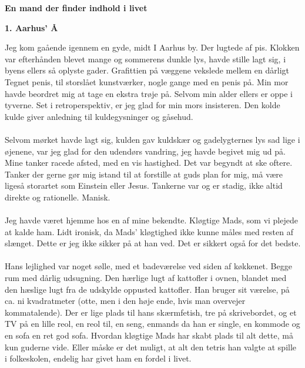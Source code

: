 \documentclass[]{article}
\begin{document}
\newpage

\begin{center}
	\Large\textbf{En mand der finder indhold i livet}
\end{center}

\begin{center}
	\large\textbf{1. Aarhus’ Å}
\end{center}

Jeg kom gaående igennem en gyde, midt I Aarhus by. Der lugtede af pis. Klokken var efterhånden blevet mange og sommerens dunkle lys, havde stille lagt sig, i byens ellers så oplyste gader. Grafittien på væggene vekslede mellem en dårligt Tegnet penis, til storslået kunstværker, nogle gange med en penis på. Min mor havde beordret mig at tage en ekstra trøje på. Selvom min alder ellers er oppe i tyverne. Set i retroperspektiv, er jeg glad for min mors insisteren. Den kolde kulde giver anledning til kuldegysninger og gåsehud.
\\ \\
Selvom mørket havde lagt sig, kulden gav kuldskær og gadelygternes lys sad lige i øjenene, var jeg glad for den udendørs vandring, jeg havde begivet mig ud på. Mine tanker racede afsted, med en vis hastighed. Det var begyndt at ske oftere. Tanker der gerne gør mig istand til at forstille at guds plan for mig, må være ligeså storartet som Einstein eller Jesus. Tankerne var og er stadig, ikke altid direkte og rationelle. Manisk.
\\ \\
Jeg havde været hjemme hos en af mine bekendte. Kløgtige Mads, som
vi plejede at kalde ham. Lidt ironisk, da Mads’ kløgtighed ikke kunne måles med resten af slænget. Dette er jeg ikke sikker på at han ved. Det er sikkert også for det bedste.
\\ \\
Hans lejlighed var noget sølle, med et badeværelse ved siden af køkkenet. Begge rum med dårlig udsugning. Den hærlige lugt af kattofler i ovnen, blandet med den hæslige lugt fra de udskylde oppusted kattofler. Han bruger sit værelse, på ca. ni kvadratmeter (otte, men i den høje ende, hvis man overvejer kommatalende). Der er lige plads til hans skærmfetish, tre på skrivebordet, og et TV på en lille reol, en reol til, en seng, enmands da han er single, en kommode og en sofa en ret god sofa. Hvordan kløgtige Mads har skabt plads til alt dette, må kun guderne vide. Eller måske er det muligt, at alt den tetris han valgte at spille i folkeskolen, endelig har givet ham en fordel i livet.
\\ \\
\end{document}

